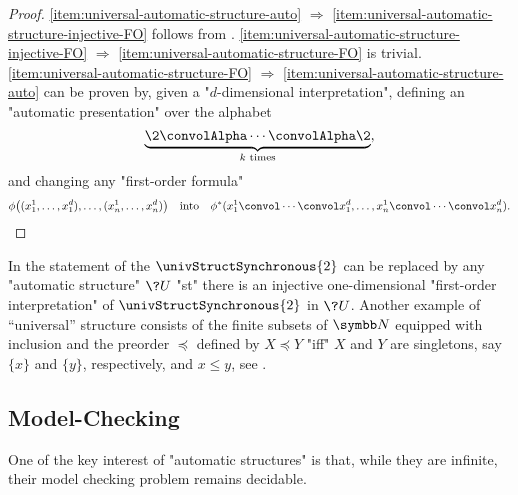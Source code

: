 \begin{proof}
	\eqref{item:universal-automatic-structure-auto} $\Rightarrow$
	\eqref{item:universal-automatic-structure-injective-FO} follows from
	.
	\eqref{item:universal-automatic-structure-injective-FO} $\Rightarrow$
	\eqref{item:universal-automatic-structure-FO} is trivial.
	\eqref{item:universal-automatic-structure-FO} $\Rightarrow$
	\eqref{item:universal-automatic-structure-auto} can be proven by,
	given a "$d$-dimensional interpretation", defining an "automatic presentation"
	over the alphabet
	\[
		\underbrace{\2 \convolAlpha \cdots \convolAlpha \2}_{
			\text{$k$ times}
		},
	\]
	and changing any "first-order formula"
	\[
		\phi\big((x_1^1, \hdots, x_1^d), \hdots, (x_n^1, \hdots, x_n^d)\big)
		\quad\text{into}\quad
		\phi^*(x_1^1 \convol \cdots \convol x_1^d, \hdots, x_n^1 \convol \cdots \convol x_n^d).\qedhere
	\]
\end{proof}

In the statement of \label{prop:universal-automatic-structure} the
$\univStructSynchronous{2}$ can be replaced by any "automatic structure" $\?U$
"st" there is an injective one-dimensional "first-order interpretation" of
$\univStructSynchronous{2}$ in $\?U$. 
Another example of ``universal'' structure consists of the finite subsets of $\N$ equipped
with inclusion and the preorder $\preceq$ defined by $X \preceq Y$ "iff" $X$ and $Y$ are 
singletons, say $\{x\}$ and $\{y\}$, respectively, and $x \leq y$,
see \cite[Theorem~XII.2.3]{Blumensath2024MSOModelTheory}.


\subsection{Model-Checking}

One of the key interest of "automatic structures" is that, while they are infinite,
their model checking problem remains decidable.


